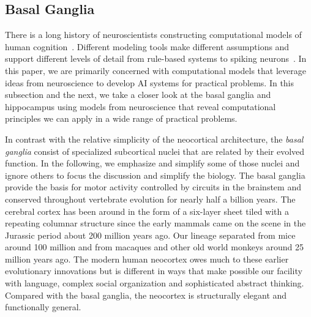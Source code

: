 \documentclass[letterpaper,11pt]{article}
\begin{document}


\subsection{Basal Ganglia}
\label{subsection_basal_ganlia}



There is a long history of neuroscientists constructing computational models of human cognition~\cite{McClelland79,McClellandandRumelhartPR-88,LebiereandAndersonCSS-93,OReillySCIENCE-06,BotvinickPTRS_B-07}. Different modeling tools make different assumptions and support different levels of detail from rule-based systems to spiking neurons~\cite{OReillyetalLEABRA-16,OReillyetalCCN-12,RasmussenetalPLoS-ONE-17,Eliasmith2013,BlouwandEliasmithCSS-13,JilketalJETAI-08}. In this paper, we are primarily concerned with computational models that leverage ideas from neuroscience to develop AI systems for practical problems. In this subsection and the next, we take a closer look at the basal ganglia and hippocampus using models from neuroscience that reveal computational principles we can apply in a wide range of practical problems.

In contrast with the relative simplicity of the neocortical architecture, the {\it{basal ganglia}} consist of specialized subcortical nuclei that are related by their evolved function. In the following, we emphasize and simplify some of those nuclei and ignore others to focus the discussion and simplify the biology. The basal ganglia provide the basis for motor activity controlled by circuits in the brainstem and conserved throughout vertebrate evolution for nearly half a billion years. The cerebral cortex has been around in the form of a six-layer sheet tiled with a repeating columnar structure since the early mammals came on the scene in the Jurassic period about 200 million years ago. Our lineage separated from mice around 100 million and from macaques and other old world monkeys around 25 million years ago. The modern human neocortex owes much to these earlier evolutionary innovations but is different in ways that make possible our facility with language, complex social organization and sophisticated abstract thinking. Compared with the basal ganglia, the neocortex is structurally elegant and functionally general.
\end{document}
